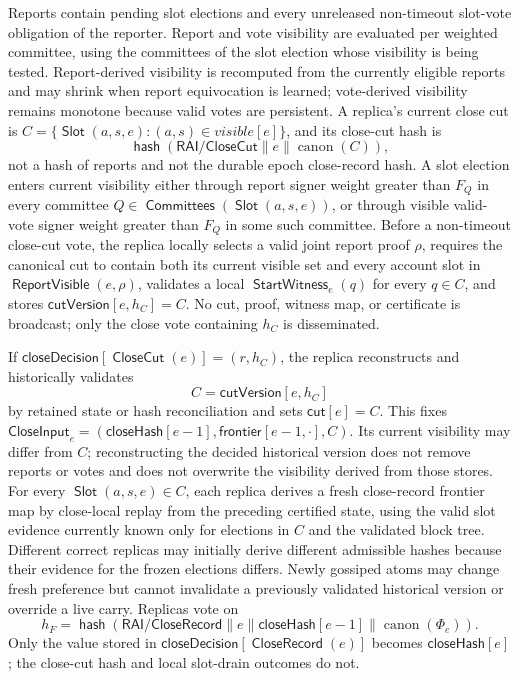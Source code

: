 \documentclass[sigplan,twocolumn,review,anonymous]{acmart}
\newcommand{\func}[1]{\operatorname{\mathsf{#1}}}
\newcommand{\hash}{\func{hash}}
\newcommand{\Slot}{\func{Slot}}
\newcommand{\CloseCut}{\func{CloseCut}}
\newcommand{\CloseRecord}{\func{CloseRecord}}
\newcommand{\closeDecision}{\mathsf{closeDecision}}
\newcommand{\frontier}{\mathsf{frontier}}
\newcommand{\closeHash}{\mathsf{closeHash}}
\newcommand{\Committees}{\func{Committees}}
\newcommand{\closeCut}{\mathsf{cut}}
\newcommand{\ReportVisible}{\func{ReportVisible}}
\newcommand{\cutVersion}{\mathsf{cutVersion}}
\begin{document}
Reports contain pending slot elections and every unreleased non-timeout slot-vote obligation of
the reporter.  Report and vote visibility are evaluated per weighted committee, using the committees of
the slot election whose visibility is being tested.  Report-derived visibility is recomputed from the
currently eligible reports and may shrink when report equivocation is learned; vote-derived visibility
remains monotone because valid votes are persistent.  A replica's current close cut is
\(C=\{\Slot(a,s,e):(a,s)\in visible[e]\}\), and its close-cut hash is
\[
\hash(\mathsf{RAI/CloseCut}\parallel e\parallel\operatorname{canon}(C)),
\]
not a hash of reports and not the durable epoch close-record hash.  A slot election enters current
visibility either through report signer weight greater than \(F_Q\) in every committee
\(Q\in\Committees(\Slot(a,s,e))\), or through visible valid-vote signer weight greater than \(F_Q\)
in some such committee.  Before a non-timeout close-cut vote, the replica locally selects a valid joint
report proof \(\rho\), requires the canonical cut to contain both its current visible set and every
account slot in \(\ReportVisible(e,\rho)\), validates a local \(\func{StartWitness}_e(q)\) for every
\(q\in C\), and stores \(\cutVersion[e,h_C]=C\).  No cut, proof, witness map, or certificate is
broadcast; only the close vote containing \(h_C\) is disseminated.

If \(\closeDecision[\CloseCut(e)]=(r,h_C)\), the replica reconstructs and historically validates
\[
C=\cutVersion[e,h_C]
\]
by retained state or hash reconciliation and sets \(\closeCut[e]=C\).  This fixes
\(\mathsf{CloseInput}_e=(\closeHash[e-1],\frontier[e-1,\cdot],C)\).  Its current visibility may differ
from \(C\); reconstructing the decided historical version does not remove reports or votes and does not
overwrite the visibility derived from those stores.  For every \(\Slot(a,s,e)\in C\), each replica
derives a fresh close-record frontier map by close-local replay from the preceding certified state,
using the valid slot evidence currently known only for elections in \(C\) and the validated block tree.
Different correct replicas may initially derive different admissible hashes because their evidence for
the frozen elections differs.  Newly gossiped atoms may change fresh preference but cannot invalidate a
previously validated historical version or override a live carry.  Replicas vote on
\[
h_F=\hash(\mathsf{RAI/CloseRecord}\parallel e\parallel\closeHash[e-1]
\parallel\operatorname{canon}(\Phi_e)).
\]
Only the value stored in \(\closeDecision[\CloseRecord(e)]\) becomes \(\closeHash[e]\); the close-cut
hash and local slot-drain outcomes do not.
\end{document}
